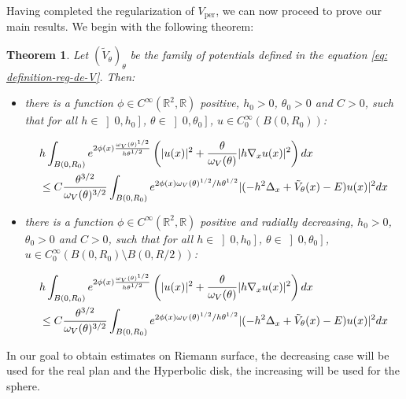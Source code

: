 \documentclass[leqno,11pt,letterpaper, english]{amsart}
\newcommand{\nn}{\nonumber}
\theoremstyle{plain}
\newtheorem{thm}{Theorem}
\theoremstyle{definition}
\numberwithin{equation}{section}
\begin{document}
Having completed the regularization of \( V_{\text{per}} \), we can now proceed to prove our main results. We begin with the following theorem:

\begin{thm}
\label{thm:EStimCarleman}
Let $(\tilde{V}_\theta)_\theta$ be the family of potentials defined in the equation \ref{eq: definition-reg-de-V}. Then:

\begin{itemize}
\item there is a function $\phi \in C^\infty(\mathbb{R}^2,\mathbb{R})$ positive, $h_0 >0 $, $\theta_0>0$ and $C>0$, such that for all $ h\in \left]0, h_0 \right]$, $\theta \in \left]0, \theta_0 \right] $, $u \in C_0^\infty(B(0,R_0))$:

\begin{align}
    &h\int_{B(0,R_0)} e^{2\phi(x)\frac{\omega_V(\theta)^{1/2}}{h\theta^{1/2}}} \left(|u(x)|^2 +\frac{\theta}{\omega_V(\theta)} |h\nabla_x u(x)|^2\right)dx\nn\\
    &\leq C \frac{\theta^{3/2}}{\omega_V(\theta)^{3/2}}\int_{B(0,R_0)} e^{2\phi(x)\omega_V(\theta)^{1/2}/h\theta^{1/2}}|(-h^2\Delta_x +\Tilde{V}_{\theta}(x)- E)u(x)|^2 dx
\end{align}

\item there is a function $\phi \in C^\infty(\mathbb{R}^2,\mathbb{R})$ positive and radially decreasing, $h_0 >0 $, $\theta_0>0$ and $C>0$, such that for all $ h\in \left]0, h_0 \right]$, $\theta \in \left]0, \theta_0 \right] $, $u \in C_0^\infty(B(0,R_0)\setminus B(0,R/2))$:

\begin{align}
    &h\int_{B(0,R_0)} e^{2\phi(x)\frac{\omega_V(\theta)^{1/2}}{h\theta^{1/2}}} \left(|u(x)|^2 +\frac{\theta}{\omega_V(\theta)} |h\nabla_x u(x)|^2\right)dx\nn\\
    &\leq C \frac{\theta^{3/2}}{\omega_V(\theta)^{3/2}}\int_{B(0,R_0)} e^{2\phi(x)\omega_V(\theta)^{1/2}/h\theta^{1/2}}|(-h^2\Delta_x +\Tilde{V}_{\theta}(x)- E) u(x)|^2 dx
\end{align}
 
\end{itemize}
\end{thm}

In our goal to obtain estimates on Riemann surface, the decreasing case will be used for the real plan and the Hyperbolic disk, the increasing will be used for the sphere.
\end{document}
